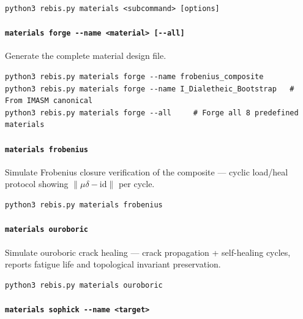 \begin{verbatim}
python3 rebis.py materials <subcommand> [options]
\end{verbatim}

\hypertarget{materials-forge---name-material---all}{%
\paragraph{\texorpdfstring{\texttt{materials\ forge\ -\/-name\ \textless{}material\textgreater{}\ {[}-\/-all{]}}}{materials forge -\/-name \textless material\textgreater{} {[}-\/-all{]}}}\label{materials-forge---name-material---all}}

Generate the complete material design file.

\begin{verbatim}
python3 rebis.py materials forge --name frobenius_composite
python3 rebis.py materials forge --name I_Dialetheic_Bootstrap   # From IMASM canonical
python3 rebis.py materials forge --all     # Forge all 8 predefined materials
\end{verbatim}

\hypertarget{materials-frobenius}{%
\paragraph{\texorpdfstring{\texttt{materials\ frobenius}}{materials frobenius}}\label{materials-frobenius}}

Simulate Frobenius closure verification of the composite --- cyclic
load/heal protocol showing \(\|\mu\delta-\text{id}\|\) per cycle.

\begin{verbatim}
python3 rebis.py materials frobenius
\end{verbatim}

\hypertarget{materials-ouroboric}{%
\paragraph{\texorpdfstring{\texttt{materials\ ouroboric}}{materials ouroboric}}\label{materials-ouroboric}}

Simulate ouroboric crack healing --- crack propagation + self-healing
cycles, reports fatigue life and topological invariant preservation.

\begin{verbatim}
python3 rebis.py materials ouroboric
\end{verbatim}

\hypertarget{materials-sophick---name-target}{%
\paragraph{\texorpdfstring{\texttt{materials\ sophick\ -\/-name\ \textless{}target\textgreater{}}}{materials sophick -\/-name \textless target\textgreater{}}}\label{materials-sophick---name-target}}

